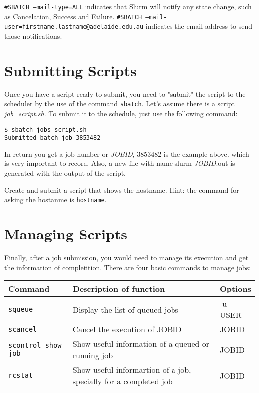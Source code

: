 \begin{information}
	\texttt{\#SBATCH --mail-type=ALL} indicates that Slurm will notify any state change, such as Cancelation, Success and Failure.
	\texttt{\#SBATCH --mail-user=firstname.lastname@adelaide.edu.au} indicates the email address to send those notifications.
\end{information}

\section{Submitting Scripts}
Once you have a script ready to submit, you need to "submit" the script to the scheduler by the use of the command \texttt{sbatch}. 
Let's assume there is a script \textit{job\_script.sh}. To submit it to the schedule, just use the following command:

\begin{lstlisting}[style=command_syntax]
$ sbatch jobs_script.sh
Submitted batch job 3853482
\end{lstlisting}

In return you get a job number or \textit{JOBID}, 3853482 is the example above, which is very important to record.
Also, a new file with name slurm-\textit{JOBID}.out is generated with the output of the script.

\begin{questions}
    Create and submit a script that shows the hostname. Hint: the command for asking the hostanme is \texttt{hostname}.
\end{questions}

\section{Managing Scripts}
Finally, after a job submission, you would need to manage its execution and get the information of completition. There are four basic commands to manage jobs:
\begin{center}
	\renewcommand{\arraystretch}{1.6}
	\begin{tabular}{|p{4cm} | p{6.5cm} | p{4.5cm}|}
		\hline
		\textbf{Command} & \textbf{Description of function} & \textbf{Options} \\ \hline
		\texttt{squeue} & Display the list of queued jobs & -u USER \\ \hline
		\texttt{scancel} & Cancel the execution of JOBID & JOBID \\ \hline
		\texttt{scontrol show job} & Show useful information of a queued or running job & JOBID \\ \hline
		\texttt{rcstat} & Show useful informartion of a job, specially for a completed job & JOBID \\ \hline
	\end{tabular}
\end{center}

